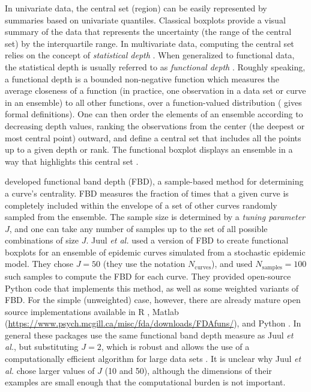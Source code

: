 \documentclass[fleqn,10pt,lineno]{wlpeerj}
\newcommand{\ncurve}{\ensuremath{N_{\textrm{curves}}}\xspace}
\newcommand{\nsample}{\ensuremath{N_{\textrm{samples}}}\xspace}
\newcommand{\juul}{Juul \emph{et al.}\xspace}  %
\begin{document}
In univariate data, the central set (region) can be easily represented by summaries based on univariate quantiles. Classical boxplots provide a visual summary of the data that represents the uncertainty (the range of the central set) by the interquartile range. In multivariate data, computing the central set relies on the concept of \emph{statistical depth} \citep{mahalanobis1936generalized, tukey1975mathematics, oja1983descriptive, liu1990notion, singh1991notion, vardi2000multivariate, zuo2003projection}. When generalized to functional data, the statistical depth is usually referred to as \emph{functional depth} \citep{fraiman2001trimmed}.
Roughly speaking, a functional depth is a bounded non-negative function which measures the average closeness of a function (in practice, one observation in a data set or curve in an ensemble) to all other functions, over a function-valued distribution (\cite{zuo2000general} gives formal definitions). 
One can then order the elements of an ensemble according to decreasing depth values, ranking the observations from the center (the deepest or most central point) outward, and define a central set that includes all the points up to a given depth or rank. The functional boxplot displays an ensemble in a way that highlights this central set \citep{sun2011functional,sun2012exact}.

 \cite{lopez2007depth} developed functional band depth (FBD), a sample-based method for determining a curve's centrality. FBD measures the fraction of times that a given curve is completely included within the envelope of a set of other curves randomly sampled from the ensemble. The sample size is determined by a \emph{tuning parameter} $J$, and one can take any number of samples up to the set of all possible combinations of size $J$. \juul used a version of FBD to create functional boxplots for an ensemble of epidemic curves simulated from a stochastic epidemic model. They chose $J=50$ (they use the notation \ncurve), and used $\nsample=100$ such samples to compute the FBD for each curve. They provided open-source Python code that implements this method, as well as some weighted variants of FBD. For the simple (unweighted) case, however, there are already mature open source implementations available in R \citep{fda_pkg,roahd}, Matlab (\url{https://www.psych.mcgill.ca/misc/fda/downloads/FDAfuns/}), and Python \citep{seabold2010statsmodels}. In general these packages use the same functional band depth measure as \juul, but substituting $J=2$, which is robust \citep{lopez2009concept} and allows the use of a computationally efficient algorithm for large data sets \citep{sun2012exact}. It is unclear why \juul chose larger values of $J$ (10 and 50), although the dimensions of their examples are small enough that the computational burden is not important.
\end{document}
